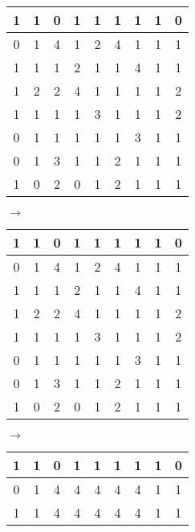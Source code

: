 \documentclass[10pt,notitlepage]{amsart}
\begin{document}
\begin{center}
\begin{tabular}{|c|c|c|c|c|c|c|c|c|}
\hline
  1&1&0&1&1&1&1&1&0\\
  \hline
  0&1&4&1&2&4&1&1&1\\
  \hline  
    1&1&1&2&1&1&4&1&1\\
  \hline    
  1&2&2&4&1&1&1&1&2\\
    \hline
  1&1&1&1&3&1&1&1&2\\
    \hline
  0&1&1&1&1&1&3&1&1\\
    \hline
  0&1&3&1&1&2&1&1&1\\
    \hline
  1&0&2&0&1&2&1&1&1\\              
  \hline
\end{tabular} $\longrightarrow$ \begin{tabular}{|c|c|c|c|c|c|c|c|c|}
\hline
  1&1&0&1&1&1&1&1&0\\
  \hline
  0&1&\cellcolor{blue!25}4&\cellcolor{blue!25}1&\cellcolor{blue!25}2&\cellcolor{blue!25}4&\cellcolor{blue!25}1&1&1\\
  \hline  
    1&1&\cellcolor{blue!25}1&\cellcolor{blue!25}2&\cellcolor{blue!25}1&\cellcolor{blue!25}1&\cellcolor{blue!25}4&1&1\\
  \hline    
  1&\cellcolor{red!25}2&2&\cellcolor{blue!25}4&\cellcolor{blue!25}1&\cellcolor{blue!25}1&1&1&\cellcolor{red!25}2\\
    \hline
  1&1&1&\cellcolor{green!25}1&\cellcolor{green!25}3&\cellcolor{green!25}1&1&1&\cellcolor{red!25}2\\
    \hline
  0&1&\cellcolor{green!25}1&\cellcolor{green!25}1&\cellcolor{green!25}1&\cellcolor{green!25}1&\cellcolor{green!25}3&1&1\\
    \hline
  0&1&\cellcolor{green!25}3&\cellcolor{green!25}1&\cellcolor{green!25}1&\cellcolor{red!25}2&1&1&1\\
    \hline
  1&0&\cellcolor{red!25}2&0&1&\cellcolor{red!25}2&1&1&1\\              
  \hline
\end{tabular} $\longrightarrow$ \begin{tabular}{|c|c|c|c|c|c|c|c|c|}
\hline
  1&1&0&1&1&1&1&1&0\\
  \hline
  0&1&\cellcolor{blue!25}4&\cellcolor{blue!25}4&\cellcolor{blue!25}4&\cellcolor{blue!25}4&\cellcolor{blue!25}4&1&1\\
  \hline  
    1&1&\cellcolor{blue!25}4&\cellcolor{blue!25}4&\cellcolor{blue!25}4&\cellcolor{blue!25}4&\cellcolor{blue!25}4&1&1\\

\end{tabular}
\end{center}
\end{document}
